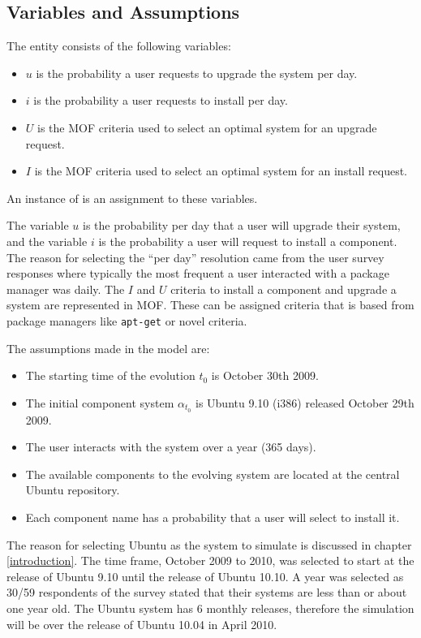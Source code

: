 \subsection{Variables and Assumptions}
The \usermodel entity consists of the following variables: 
\begin{itemize}
  \item $u$ is the probability a user requests to upgrade the system per day.
  \item $i$ is the probability a user requests to install per day.
  \item $U$ is the MOF criteria used to select an optimal system for an upgrade request.
  \item $I$ is the MOF criteria used to select an optimal system for an install request.
\end{itemize}
An instance of \usermodel is an assignment to these variables.

The variable $u$ is the probability per day that a user will upgrade their system, and the variable $i$ is the probability a user will request to install a component.
The reason for selecting the ``per day'' resolution came from the user survey responses where typically the most frequent a user interacted with a package manager was daily.
The $I$ and $U$ criteria to install a component and upgrade a system are represented in MOF.
These can be assigned criteria that is based from package managers like \texttt{apt-get} or novel criteria.


The assumptions made in the \usermodel model are:
\begin{itemize}
  \item The starting time of the evolution $t_0$ is October 30th 2009.
  \item The initial component system $\alpha_{t_0}$ is Ubuntu 9.10 (i386) released October 29th 2009.
  \item The user interacts with the system over a year (365 days).
  \item The available components to the evolving system are located at the central Ubuntu repository.
  \item Each component name has a probability that a user will select to install it. 
\end{itemize}

The reason for selecting Ubuntu as the system to simulate is discussed in chapter \ref{introduction}.
The time frame, October 2009 to 2010, was selected to start at the release of Ubuntu 9.10 until the release of Ubuntu 10.10.
A year was selected as 30/59 respondents of the survey stated that their systems are less than or about one year old.
The Ubuntu system has 6 monthly releases, therefore the simulation will be over the release of Ubuntu 10.04 in April 2010.


